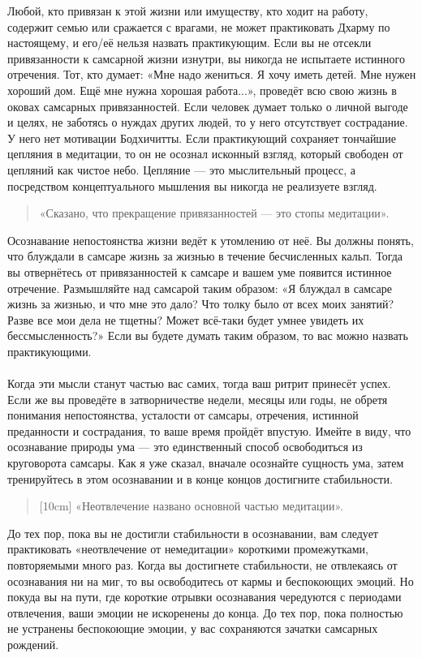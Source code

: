 Любой, кто привязан к этой жизни или имуществу, кто ходит на работу, содержит семью или сражается с врагами, не может практиковать Дхарму по настоящему, и его/её нельзя назвать практикующим. Если вы не отсекли привязанности к самсарной жизни изнутри, вы никогда не испытаете истинного отречения. Тот, кто думает: «Мне надо жениться. Я хочу иметь детей. Мне нужен хороший дом. Ещё мне нужна хорошая работа...», проведёт всю свою жизнь в оковах самсарных привязанностей. Если человек думает только о личной выгоде и целях, не заботясь о нуждах других людей, то у него отсутствует сострадание. У него нет мотивации Бодхичитты. Если практикующий сохраняет тончайшие цепляния в медита\-ции, то он не осознал исконный взгляд, который свободен от цепляний как чистое небо. Цепляние — это мыслительный процесс, а посредством концептуального мышления вы никог\-да не реализуете взгляд.
\begin{verse}
«Сказано, что прекращение привязанностей — это стопы медитации».
\end{verse}
Осознавание непостоянства жизни ведёт к утомлению от неё. Вы должны понять, что блуждали в самсаре жизнь за жизнью в течение бесчисленных кальп. Тогда вы отвернётесь от привязанностей к самсаре и вашем уме появится истинное отречение. Размышляйте над самсарой таким образом: «Я блуждал в самсаре жизнь за жизнью, и что мне это дало? Что толку было от всех моих занятий? Разве все мои дела не тщетны? Может всё-таки будет умнее увидеть их бессмысленность?» Если вы будете думать таким образом, то вас можно назвать практикующими.
\\ \\ Когда эти мысли станут частью вас самих, тогда ваш ритрит принесёт успех. Если же вы проведёте в затворничестве недели, месяцы или годы, не обретя понимания непостоянства, усталости от самсары, отречения, истинной преданности и сострадания, то ваше время пройдёт впустую. Имейте в виду, что осознавание природы ума — это единственный способ освободиться из круговорота самсары. Как я уже сказал, вначале осознайте сущность ума, затем тренируйтесь в этом осознавании и в конце концов достигните стабильности.
\begin{verse}[10cm]
«Неотвлечение названо основной частью медитации».
\end{verse}
До тех пор, пока вы не достигли стабильности в осознавании, вам следует практиковать «неотвлечение от немедитации» короткими промежутками, повторяемыми много раз. Когда вы достигнете стабильности, не отвлекаясь от осознавания ни на миг, то вы освободитесь от кармы и беспокоющих эмоций. Но покуда вы на пути, где короткие отрывки осознавания чередуются с периодами отвлечения, ваши эмоции не искоренены до конца. До тех пор, пока полностью не устранены беспокоющие эмоции, у вас сохраняются зачатки самсарных рождений.
